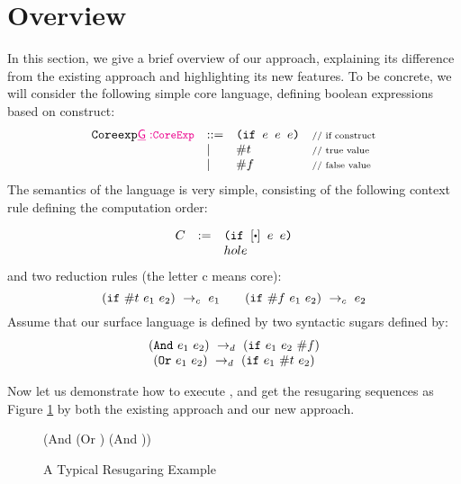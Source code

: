 \section{Overview}
\label{sec2}


In this section, we give a brief overview of our approach, explaining its difference from the existing  approach and highlighting its new features. To be concrete, we will consider the following simple core language, defining boolean expressions based on  construct:
\[
\begin{array}{lllll}
\mbox{\tt Coreexp}{\small\color{magenta}\underline{\sf{G}}:} {\color{magenta}{\small \mbox{\tt CoreExp}}} &::=& \texttt{(if~$e$~$e$~$e$)} &\mbox{{\scriptsize // if construct}}\\
& |& \#t  & \mbox{{\scriptsize // true value}}\\
& |& \#f & \mbox{{\scriptsize // false value}}
\end{array}
\]
The semantics of the language is very simple, consisting of the following context rule defining the computation order:

\[
\begin{array}{lcl}
C &:=& \Code{(if $[\bigcdot]$ $e$ $e$)}\\
&&hole\\
\end{array}
\]
and two reduction rules (the letter c means core):
\[
\centering
 \redc{(\m{if}~\true~e_1~e_2)}{e_1}  \qquad \redc{(\m{if}~\false~e_1~e_2)}{e_2} 
\]
Assume that our surface language is defined by two syntactic sugars defined by:
\[
\begin{array}{c}
(\mbox{\tt And}~e_1~e_2) ~\rightarrow_d~ (\mbox{\tt if}~e_1~e_2~\#f)\\
(\mbox{\tt Or}~e_1~e_2) ~\rightarrow_d~ (\mbox{\tt if}~e_1~\#t~e_2)
\end{array}
\]


Now let us demonstrate how to execute , and get the resugaring sequences as Figure \ref{fig:standard} by both the existing approach and our new approach.

\begin{figure}[thb]
\begin{center}
\begin{minipage}{6cm}
\begin{footnotesize}
\begin{Codes}
    (And (Or \true \false) (And \false \true))
\end{Codes}
\end{footnotesize}
\end{minipage}
\end{center}
\caption{A Typical Resugaring Example}
\label{fig:standard}
\end{figure}


